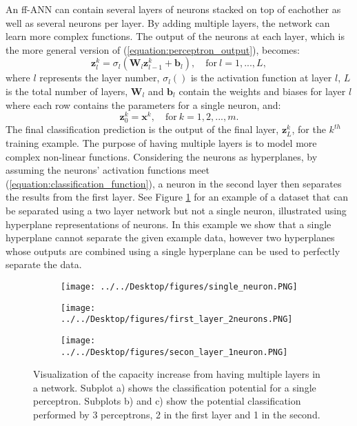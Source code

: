 \documentclass[letterpaper,12pt,titlepage,oneside,final]{book}
\begin{document}
	 An ff-ANN can contain several layers of neurons stacked on top of eachother as well as several neurons per layer. By adding multiple layers, the network can learn more complex functions. The output of the neurons at each layer, which is the more general version of (\ref{equation:perceptron_output}), becomes:
	\begin{equation}
	\mathbf{z}_{l}^{k} = \sigma_{l}(\mathbf{W}_{l}\mathbf{z}_{l-1}^{k} + \mathbf{b}_{l}), \quad \text{for} \ l = 1, ... , L,
	\end{equation}
	where $l$ represents the layer number, $\sigma_{l}()$ is the activation function at layer $l$, $L$ is the total number of layers, $\mathbf{W}_{l}$ and $\mathbf{b}_{l}$ contain the weights and biases for layer $l$ where each row contains the parameters for a single neuron, and:
	\begin{equation}
	\mathbf{z}_{0}^{k} = \mathbf{x}^{k}, \quad \text{for} \ k=1, 2, ... , m.
	\end{equation}
	The final classification prediction is the output of the final layer, $\mathbf{z}_{L}^{k}$, for the $k^{th}$ training example. The purpose of having multiple layers is to model more complex non-linear functions. Considering the neurons as hyperplanes, by assuming the neurons' activation functions meet (\ref{equation:classification_function}), a neuron in the second layer then separates the results from the first layer. See Figure \ref{figure:MLP} for an example of a dataset that can be separated using a two layer network but not a single neuron, illustrated using hyperplane representations of neurons. In this example we show that a single hyperplane cannot separate the given example data, however two hyperplanes whose outputs are combined using a single hyperplane can be used to perfectly separate the data.
	\begin{figure}
		\centering
		\begin{subfigure}{.3\textwidth}
			\texttt{[image: ../../Desktop/figures/single\_neuron.PNG]}
			\caption{}
		\end{subfigure}
		\begin{subfigure}{.3\textwidth}
			\texttt{[image: ../../Desktop/figures/first\_layer\_2neurons.PNG]}
			\caption{}
		\end{subfigure}
		\begin{subfigure}{.3\textwidth}
			\texttt{[image: ../../Desktop/figures/secon\_layer\_1neuron.PNG]}
			\caption{}
		\end{subfigure}
		\caption{Visualization of the capacity increase from having multiple layers in a network. Subplot a) shows the classification potential for a single perceptron. Subplots b) and c) show the potential classification performed by 3 perceptrons, 2 in the first layer and 1 in the second.}
		\label{figure:MLP}
	\end{figure}
	
\end{document}
